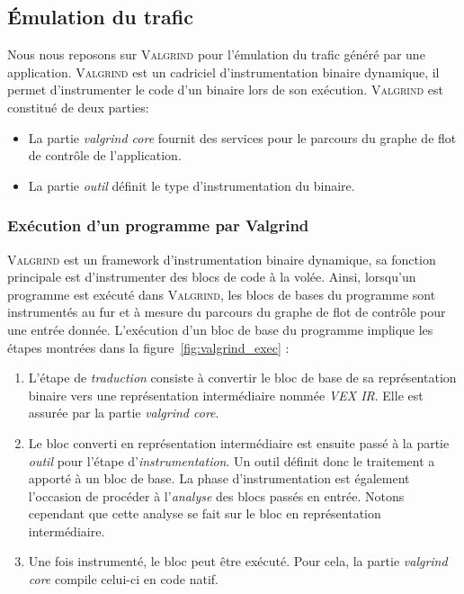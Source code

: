 \subsection{Émulation du trafic}

Nous nous reposons sur \textsc{Valgrind} pour l'émulation du trafic généré par une application.
\textsc{Valgrind} est un cadriciel d'instrumentation binaire dynamique, il permet d'instrumenter le code d'un binaire lors de son exécution.
\textsc{Valgrind} est constitué de deux parties: 
\begin{itemize}
	\item La partie \emph{valgrind core} fournit des services pour le parcours du graphe de flot de contrôle de l'application.
	\item La partie \emph{outil} définit le type d'instrumentation du binaire.
\end{itemize}

\subsubsection{Exécution d'un programme par Valgrind}

\textsc{Valgrind} est un framework d'instrumentation binaire dynamique, sa fonction principale est d'instrumenter des blocs de code à la volée.
Ainsi, lorsqu'un programme est exécuté dans \textsc{Valgrind}, les blocs de bases du programme sont instrumentés au fur et à mesure du parcours du graphe de flot de contrôle pour une entrée donnée.
L'exécution d'un bloc de base du programme implique les étapes montrées dans la figure~\ref{fig:valgrind_exec} :
\begin{enumerate}
	\item L'étape de \emph{traduction} consiste à convertir le bloc de base de sa représentation binaire vers une représentation intermédiaire nommée \emph{VEX IR}.
	Elle est assurée par la partie \emph{valgrind core}.
	\item Le bloc converti en représentation intermédiaire est ensuite passé à la partie \emph{outil} pour l'étape d'\emph{instrumentation}.
	Un outil définit donc le traitement a apporté à un bloc de base.
	La phase d'instrumentation est également l'occasion de procéder à l'\emph{analyse} des blocs passés en entrée.
	Notons cependant que cette analyse se fait sur le bloc en représentation intermédiaire.
	\item Une fois instrumenté, le bloc peut être exécuté. Pour cela, la partie \emph{valgrind core} compile celui-ci en code natif.
\end{enumerate}

